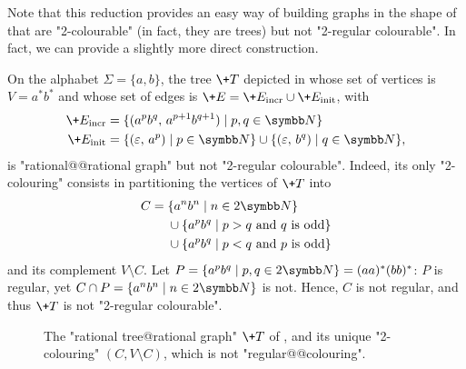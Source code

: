 Note that this reduction provides an easy way of building
graphs in the shape of  that are "2-colourable" (in fact, they are trees) but not "2-regular colourable". In fact, we can provide a slightly more
direct construction.

\begin{example}
    \AP\label{ex:tree-not-2-reg-colourable}
    On the alphabet $\Sigma = \{a,b\}$, the tree $\+T$ depicted in  whose set of vertices is $V = a^*b^*$ and whose set 
    of edges is $\+E = \+E_{\mathrm{incr}} \cup \+E_{\mathrm{init}}$, with 
    \begin{align*}
        \+E_{\mathrm{incr}} & = \{(a^pb^q,\, a^{p+1}b^{q+1}) \mid p,q \in \N\} \\
        \+E_{\mathrm{init}} & = \{(\varepsilon,\, a^p) \mid p \in \N\} \cup \{(\varepsilon,\, b^q) \mid q \in \N\}, 
    \end{align*}    
    is "rational@@rational graph" but not "2-regular colourable".
    Indeed, its only "2-colouring"
    consists in partitioning the vertices of $\+T$ into
    \begin{align*}
        C =\;& \{a^n b^n \mid n \in 2\N\} \\
            & \cup \{a^p b^q \mid p > q \text{ and $q$ is odd}\} \\
            & \cup \{a^p b^q \mid p < q \text{ and $p$ is odd}\}
    \end{align*}
    and its complement $V \setminus C$.
    Let $P = \{a^p b^q \mid p, q \in 2\N\} = (aa)^*(bb)^*$:
    $P$ is regular, yet $C \cap P = \{a^n b^n \mid n \in 2\N\}$ is not.
    Hence, $C$ is not regular, and thus $\+T$ is not "2-regular colourable".
\end{example}

\begin{figure}
    \centering
    \begin{tikzpicture}
        
    \end{tikzpicture}
    \caption{
        \label{fig:tree-not-2reg-colour}
        The "rational tree@rational graph" $\+T$ of ,
        and its unique "2-colouring" $(C, V\setminus C)$, which is not "regular@@colouring".
    }
\end{figure}